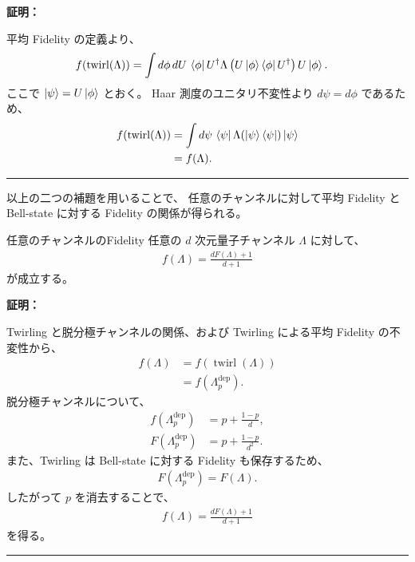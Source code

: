 \documentclass[a4paper,10.5pt]{article}
\numberwithin{equation}{section}
\newenvironment{proofbox}
{\begin{prooflabel}\textbf{証明：}\end{prooflabel}\vspace{0.8em}}
{\par\vspace{1em}\hrule\vspace{1em}}
\begin{document}
\begin{proofbox}
平均 Fidelity の定義より、
\begin{align*}
    f(\operatorname{twirl}(\Lambda))
    &=
    \int d\phi\,dU\,
    \bra{\phi}
    U^\dagger
    \Lambda
    \left(
    U\ket{\phi}\bra{\phi}U^\dagger
    \right)
    U
    \ket{\phi}.
\end{align*}
ここで $\ket{\psi}=U\ket{\phi}$ とおく。
Haar 測度のユニタリ不変性より $d\psi=d\phi$ であるため、
\begin{align*}
    f(\operatorname{twirl}(\Lambda))
    &=
    \int d\psi\,
    \bra{\psi}
    \Lambda(\ket{\psi}\bra{\psi})
    \ket{\psi}\\
    &=
    f(\Lambda).
\end{align*}
\end{proofbox}


以上の二つの補題を用いることで、
任意のチャンネルに対して平均 Fidelity と
Bell-state に対する Fidelity の関係が得られる。

\begin{theorembox}{任意のチャンネルのFidelity}
任意の $d$ 次元量子チャンネル $\Lambda$ に対して、
\begin{align*}
    \boxed{
    f(\Lambda)
    =
    \frac{dF(\Lambda)+1}{d+1}
    }
\end{align*}
が成立する。
\end{theorembox}

\begin{proofbox}
Twirling と脱分極チャンネルの関係、および
Twirling による平均 Fidelity の不変性から、
\begin{align*}
    f(\Lambda)
    &=
    f(\operatorname{twirl}(\Lambda))\\
    &=
    f(\Lambda_p^{\mathrm{dep}}).
\end{align*}
脱分極チャンネルについて、
\begin{align*}
    f(\Lambda_p^{\mathrm{dep}})
    &=
    p+\frac{1-p}{d},\\
    F(\Lambda_p^{\mathrm{dep}})
    &=
    p+\frac{1-p}{d^2}.
\end{align*}
また、Twirling は Bell-state に対する Fidelity も保存するため、
\begin{align*}
    F(\Lambda_p^{\mathrm{dep}})
    =
    F(\Lambda).
\end{align*}
したがって $p$ を消去することで、
\begin{align*}
    \boxed{
    f(\Lambda)
    =
    \frac{dF(\Lambda)+1}{d+1}
    }
\end{align*}
を得る。
\end{proofbox}
\end{document}
